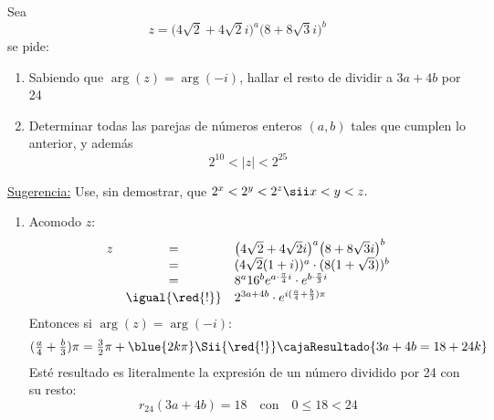 \begin{enunciado}{\ejExtra}
  Sea
  $$
    z = \big(4\sqrt{2} + 4\sqrt{2}i\big)^a \big(8+8\sqrt{3}i\big)^b
  $$
  se pide:
  \begin{enumerate}[label=\alph*)]
    \item Sabiendo que $\arg(z) = \arg(-i)$, hallar el resto de dividir a $3a + 4b$ por 24
    \item Determinar todas las parejas de números enteros $(a,b)$ tales que cumplen lo anterior, y además
          $$
            2^{10} < |z| < 2 ^{25}
          $$
  \end{enumerate}
  \underline{Sugerencia:} Use, sin demostrar, que $2^x < 2^y < 2^z \sii x < y < z.$
\end{enunciado}

\begin{enumerate}[label=\alph*)]
  \item
        Acomodo $z$:
        $$
          \begin{array}{rcl}
            z & =               & \big(4\sqrt{2} + 4\sqrt{2}i\big)^a \big(8+8\sqrt{3}i\big)^b             \\
              & =               & (4\sqrt{2} ( 1 + i ))^a \cdot (8(1 + \sqrt{3}))^b                       \\
              & =               & 8^a 16^b  e^{a \cdot \frac{\pi}{4} i} \cdot e^{b \cdot \frac{\pi}{3} i} \\
              & \igual{\red{!}} & 2^{3a + 4b} \cdot e^{i (\frac{a}{4}  +  \frac{b}{3} ) \pi}
          \end{array}
        $$
        Entonces si $\arg(z) = \arg(-i)$:
        $$
          \textstyle
          (\frac{a}{4}  +  \frac{b}{3} ) \pi = \frac{3}{2} \pi + \blue{2k\pi}
          \Sii{\red{!}}
          \cajaResultado{3a  +  4b = 18 + 24k}
        $$
        Esté resultado es literalmente la expresión de un número dividido por 24 con su resto:
        $$
          r_{24}(3a+4b) = 18 \quad \text{con} \quad 0\leq 18 < 24
        $$


\end{enumerate}
